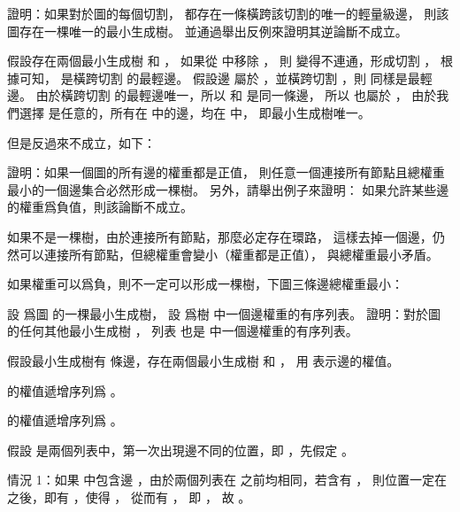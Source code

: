 \startANSWER
{}
\stopANSWER

\startEXERCISE
證明：如果對於圖的每個切割，
都存在一條橫跨該切割的唯一的輕量級邊，
則該圖存在一棵唯一的最小生成樹。
並通過舉出反例來證明其逆論斷不成立。
\stopEXERCISE

\startANSWER
假設存在兩個最小生成樹  和 ，
如果從  中移除 ，
則  變得不連通，形成切割 ，
根據\inexercise[23.1-3] 可知，  是橫跨切割  的最輕邊。
假設邊  屬於 ，並橫跨切割 ，則  同樣是最輕邊。
由於橫跨切割  的最輕邊唯一，所以  和  是同一條邊，
所以  也屬於 ，
由於我們選擇  是任意的，所有在  中的邊，均在  中，
即最小生成樹唯一。

但是反過來不成立，如下：

\externalfigure[output/e23_1_6-1]
\stopANSWER

\startEXERCISE
證明：如果一個圖的所有邊的權重都是正值，
則任意一個連接所有節點且總權重最小的一個邊集合必然形成一棵樹。
另外，請舉出例子來證明：
如果允許某些邊的權重爲負值，則該論斷不成立。
\stopEXERCISE

\startANSWER
如果不是一棵樹，由於連接所有節點，那麼必定存在環路，
這樣去掉一個邊，仍然可以連接所有節點，但總權重會變小（權重都是正值），
與總權重最小矛盾。

如果權重可以爲負，則不一定可以形成一棵樹，下圖三條邊總權重最小：

\externalfigure[output/e23_1_7-1]
\stopANSWER

\startEXERCISE
設  爲圖  的一棵最小生成樹，
設  爲樹  中一個邊權重的有序列表。
證明：對於圖  的任何其他最小生成樹 ，
列表  也是  中一個邊權重的有序列表。
\stopEXERCISE

\startANSWER
假設最小生成樹有  條邊，存在兩個最小生成樹  和 ，
用  表示邊的權值。

 的權值遞增序列爲 。

 的權值遞增序列爲 。

假設  是兩個列表中，第一次出現邊不同的位置，即 ，先假定 。

情況 1：如果  中包含邊 ，由於兩個列表在  之前均相同，若含有 ，
則位置一定在  之後，即有 ，使得 ，
從而有 ，
即 ，
故 。

